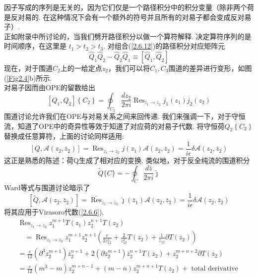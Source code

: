 因子写成的序列是无关的，因为它们仅是一个路径积分中的积分变量（除非两个荷是反对易的. 在这种情况下会有一个额外的符号并且所有的对易子都会变成反对易子）.\\
正如附录中所讨论的，当我们劈开路径积分以做一个算符解释. 决定算符序列的是时间顺序，在这里是
$t_{1}>t_{2}>t_{3}$. 对组合(\ref{2.6.12})的路径积分对应矩阵元
\begin{equation}
\hat{Q}_{1} \hat{Q}_{2}-\hat{Q}_{2} \hat{Q}_{1} \equiv\left[\hat{Q}_{1}, \hat{Q}_{2}\right]
\end{equation}
现在，对于围道$C_2$上的一给定点$z_2$，我们可以将$C_1, C_3$围道的差异进行变形，如图(\ref{Fig2.4}b)所示.\\
对易子因而由OPE的留数给出
\begin{equation}
\left[Q_{1}, Q_{2}\right]\left\{C_{2}\right\}=\oint_{C_{2}} \frac{d z_{2}}{2 \pi i} \operatorname{Res}_{z_{1} \rightarrow z_{2}} j_{1}\left(z_{1}\right) j_{2}\left(z_{2}\right)
\end{equation}
围道讨论允许我们在OPE与对易关系之间来回传递. 我们来强调一下，对于守恒流，知道了OPE中的奇异性等效于知道了对应荷的对易子代数. 将守恒荷$Q_{2}\left\{C_{2}\right\}$ 替换成任意算符，上面的讨论同样适用:
\begin{equation}
\left[Q, \mathscr{A}\left(z_{2}, \bar{z}_{2}\right)\right]=\operatorname{Res}_{z_{1} \rightarrow z_{2}} j\left(z_{1}\right) \mathscr{A}\left(z_{2}, \bar{z}_{2}\right)=\frac{1}{i \epsilon} \delta \mathscr{A}\left(z_{2}, \bar{z}_{2}\right)
\end{equation}
这正是熟悉的陈述：荷Q生成了相对应的变换. 类似地，对于反全纯流的围道积分
\begin{equation}
\tilde{Q}\{C\}=-\oint_{C} \frac{d \bar{z}}{2 \pi i} \tilde{\jmath}
\end{equation}
Ward等式与围道讨论暗示了
\begin{equation}
\left[\tilde{Q}, \mathscr{A}\left(z_{2}, \bar{z}_{2}\right)\right]=\overline{\operatorname{Res}}_{\bar{z}_{1} \rightarrow \bar{z}_{2}} \tilde{\jmath}\left(\bar{z}_{1}\right) \mathscr{A}\left(z_{2}, \bar{z}_{2}\right)=\frac{1}{i \epsilon} \delta \mathscr{A}\left(z_{2}, \bar{z}_{2}\right)
\end{equation}
将其应用于Virasoro代数(\ref{2.6.6}), 
\begin{equation}
\begin{array}{l}
\operatorname{Res}_{z_{1} \rightarrow z_{2}} z_{1}^{m+1} T\left(z_{1}\right) z_{2}^{n+1} T\left(z_{2}\right) \\
\quad=\operatorname{Res}_{z_{1} \rightarrow z_{2}} z_{1}^{m+1} z_{2}^{n+1}\left(\frac{c}{2 z_{12}^{4}}+\frac{2}{z_{12}^{2}} T\left(z_{2}\right)+\frac{1}{z_{12}} \partial T\left(z_{2}\right)\right)\\
=\frac{c}{12}\left(\partial^{3} z_{2}^{m+1}\right) z_{2}^{n+1}+2\left(\partial z_{2}^{m+1}\right) z_{2}^{n+1} T\left(z_{2}\right)+z_{2}^{m+n+2} \partial T\left(z_{2}\right) \\
=\frac{c}{12}\left(m^{3}-m\right) z_{2}^{m+n-1}+(m-n) z_{2}^{m+n+1} T\left(z_{2}\right)+\text { total derivative }
\end{array}
\end{equation}
